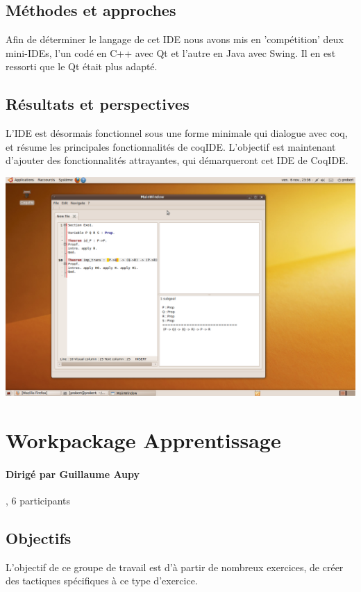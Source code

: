 \documentclass[a4paper,10pt]{article}
\begin{document}
\subsection{Méthodes et approches}
Afin de déterminer le langage de cet IDE nous avons mis en 'compétition' deux mini-IDEs,
 l'un codé en C++ avec Qt et l'autre en Java avec Swing. Il en est ressorti que le Qt était plus adapté.


\subsection{Résultats et perspectives} 
 L'IDE est désormais fonctionnel sous une forme minimale qui dialogue avec coq, et résume les principales fonctionnalités de coqIDE.
L'objectif est maintenant d'ajouter des fonctionnalités attrayantes, qui démarqueront cet IDE de CoqIDE.

\includegraphics[scale=0.35]{Capture.png}

\section{Workpackage Apprentissage}
\paragraph{Dirigé par Guillaume Aupy}, 6 participants

\subsection{Objectifs}
L'objectif de ce groupe de travail est d'à partir de nombreux exercices, de créer des tactiques spécifiques à ce type d'exercice.
\end{document}
